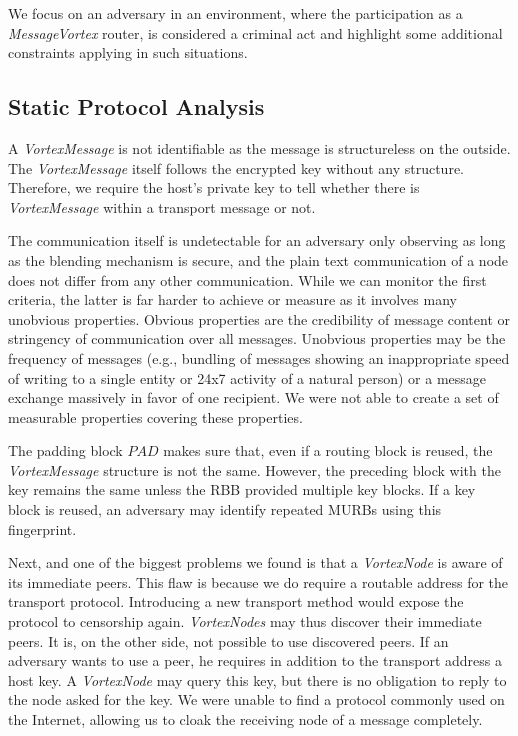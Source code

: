\documentclass[acmsmall, screen, review]{acmart}
\begin{document}
We focus on an adversary in an environment, where the participation as a \emph{MessageVortex} router, is considered a criminal act and highlight some additional constraints applying in such situations.

\subsection{Static Protocol Analysis\label{sec:staticAnalysis}}
A \emph{VortexMessage} is not identifiable as the message is structureless on the outside. The \emph{VortexMessage} itself follows the encrypted key without any structure. Therefore, we require the host's private key to tell whether there is \emph{VortexMessage} within a transport message or not.

The communication itself is undetectable for an adversary only observing as long as the blending mechanism is secure, and the plain text communication of a node does not differ from any other communication. While we can monitor the first criteria, the latter is far harder to achieve or measure as it involves many unobvious properties. Obvious properties are the credibility of message content or stringency of communication over all messages. Unobvious properties may be the frequency of messages (e.g., bundling of messages showing an inappropriate speed of writing to a single entity or 24x7 activity of a natural person) or a message exchange massively in favor of one recipient. We were not able to create a set of measurable properties covering these properties.

The padding block $PAD$ makes sure that, even if a routing block is reused, the \emph{VortexMessage} structure is not the same. However, the preceding block with the key remains the same unless the RBB provided multiple key blocks. If a key block is reused, an adversary may identify repeated MURBs using this fingerprint.

Next, and one of the biggest problems we found is that a \emph{VortexNode} is aware of its immediate peers. This flaw is because we do require a routable address for the transport protocol. Introducing a new transport method would expose the protocol to censorship again. \emph{VortexNodes} may thus discover their immediate peers. It is, on the other side, not possible to use discovered peers. If an adversary wants to use a peer, he requires in addition to the transport address a host key. A \emph{VortexNode} may query this key, but there is no obligation to reply to the node asked for the key. We were unable to find a protocol commonly used on the Internet, allowing us to cloak the receiving node of a message completely.
\end{document}
